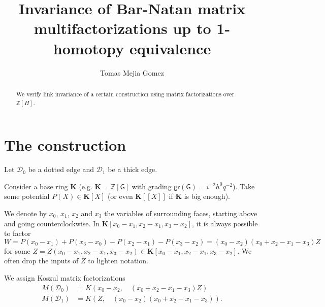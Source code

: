 \documentclass{article}
\title{Invariance of Bar-Natan matrix multifactorizations up to 1-homotopy equivalence}
\author{Tomas Mejia Gomez}
\newcommand{\Z}{\mathbb{Z}}
\newcommand{\DD}{\mathcal{D}}
\newcommand{\gr}{\mathsf{gr}}
\newcommand{\KK}{\mathbf{K}}
\newcommand{\G}{\mathsf{G}}
\theoremstyle{plain} %
\theoremstyle{definition} %
\theoremstyle{remark} %
\begin{document}
\maketitle

\begin{abstract}
We verify link invariance of a certain construction using matrix factorizations over $\Z[H]$.

\end{abstract}



\section{The construction}

Let $\DD_0$ be a dotted edge and $\DD_1$ be a thick edge. 

Consider a base ring $\KK$ (e.g. $\KK=\Z[\G]$ with grading
$\gr(\G)=i^{-2}h^0q^{-2}$). Take some potential
$P(X)\in \KK[X]$ (or even $\KK [\![X]\!]$ if $\KK$ is big enough). 

We denote by $x_0$, $x_1$, $x_2$ and $x_3$ the variables of surrounding faces, starting above and going counterclockwise. In $\KK[x_0-x_1,x_2-x_1,x_3-x_2]$, it is always possible to factor
$$W=P(x_0-x_1)+P(x_3-x_0)-P(x_2-x_1)-P(x_3-x_2)= (x_0-x_2)(x_0+x_2-x_1-x_3)Z$$
for some $Z=Z(x_0-x_1,x_2-x_1,x_3-x_2)\in \KK[x_0-x_1,x_2-x_1,x_3-x_2]$. We often drop the inputs of $Z$ to lighten notation.


We assign Koszul matrix factorizations
\begin{align*}
    M(\DD_0)&=K(x_0-x_2,\quad (x_0+x_2-x_1-x_3)Z)\\
    M(\DD_1)&=K(Z,\quad (x_0-x_2)(x_0+x_2-x_1-x_3)).
\end{align*}
\end{document}
